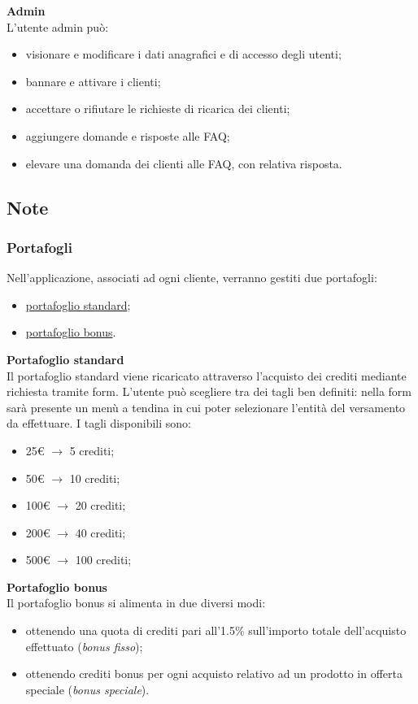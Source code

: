 \documentclass[a4paper, 14pt]{article}
\begin{document}
\begin{flushleft}
			\bigskip \textbf{Admin} \\ \smallskip
			L'utente admin può:
			\begin{itemize}
				\item visionare e modificare i dati anagrafici e di accesso degli utenti;
				\item bannare e attivare i clienti;
				\item accettare o rifiutare le richieste di ricarica dei clienti;
				\item aggiungere domande e risposte alle FAQ;
				\item elevare una domanda dei clienti alle FAQ, con relativa risposta.
			\end{itemize}
		
		\subsection{Note}
			\subsubsection{Portafogli}
				Nell'applicazione, associati ad ogni cliente, verranno gestiti due portafogli:
				\begin{itemize}
					\item \underline{portafoglio standard};
					\item \underline{portafoglio bonus}.
				\end{itemize}

				\bigskip \textbf{Portafoglio standard} \\ \smallskip			
				Il portafoglio standard viene ricaricato attraverso l’acquisto dei crediti mediante richiesta tramite form.
				L’utente può scegliere tra dei tagli ben definiti: nella form sarà presente un menù a tendina in cui poter selezionare l'entità del versamento da effettuare.
				I tagli disponibili sono:
				\begin{itemize}
					\item 25\euro \> $\rightarrow$ 5 crediti;
					\item 50\euro \> $\rightarrow$ 10 crediti;
					\item 100\euro \> $\rightarrow$ 20 crediti;
					\item 200\euro \> $\rightarrow$ 40 crediti;
					\item 500\euro \> $\rightarrow$ 100 crediti;
				\end{itemize}
				
				\bigskip \textbf{Portafoglio bonus} \\ \smallskip
				Il portafoglio bonus si alimenta in due diversi modi:
				\begin{itemize}
				\item ottenendo una quota di crediti pari all'1.5\% sull'importo totale dell'acquisto effettuato (\textit{bonus fisso});
				\item ottenendo crediti bonus per ogni acquisto relativo ad un prodotto in offerta speciale (\textit{bonus speciale}).
				\end{itemize}
			

\end{flushleft}
\end{document}

